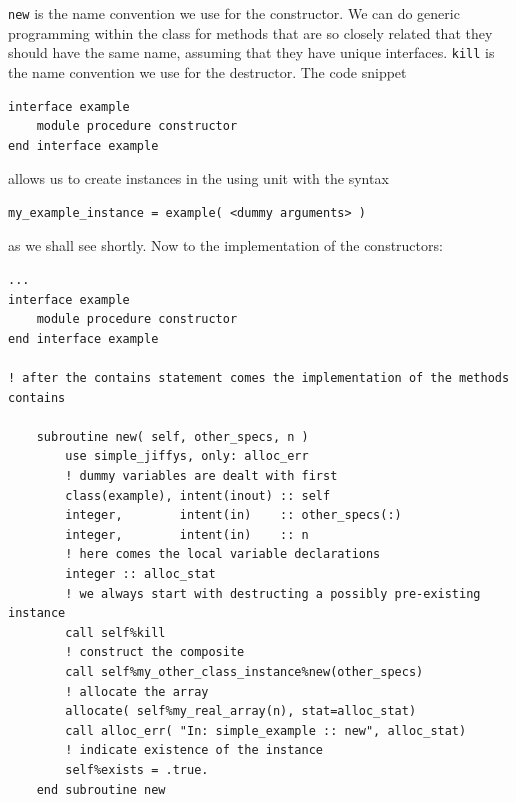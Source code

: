 \documentclass[a4paper,11pt]{article}
\begin{document}
\texttt{new} is the name convention we use for the constructor. We can do generic programming within the class for methods that are so closely related that they should have the same name, assuming that they have unique interfaces. \texttt{kill} is the name convention we use for the destructor. The  code snippet
\begin{verbatim}
interface example
    module procedure constructor
end interface example
\end{verbatim}
allows us to create instances in the using unit with the syntax
\begin{verbatim}
my_example_instance = example( <dummy arguments> )
\end{verbatim}
as we shall see shortly. Now to the implementation of the constructors:
\begin{verbatim}
...
interface example
    module procedure constructor
end interface example

! after the contains statement comes the implementation of the methods
contains

    subroutine new( self, other_specs, n )
        use simple_jiffys, only: alloc_err
        ! dummy variables are dealt with first
        class(example), intent(inout) :: self
        integer,        intent(in)    :: other_specs(:)
        integer,        intent(in)    :: n
        ! here comes the local variable declarations
        integer :: alloc_stat
        ! we always start with destructing a possibly pre-existing instance
        call self%kill
        ! construct the composite
        call self%my_other_class_instance%new(other_specs)
        ! allocate the array
        allocate( self%my_real_array(n), stat=alloc_stat)
        call alloc_err( "In: simple_example :: new", alloc_stat)
        ! indicate existence of the instance
        self%exists = .true.
    end subroutine new
\end{verbatim}
\end{document}
